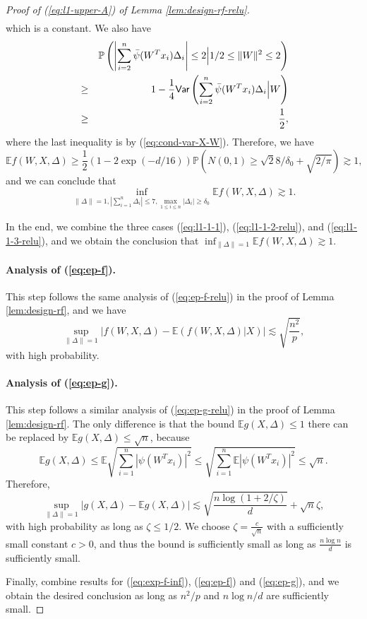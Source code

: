 \begin{proof}[Proof of (\ref{eq:l1-upper-A}) of Lemma \ref{lem:design-rf-relu}]
\begin{eqnarray*}
\end{eqnarray*}
which is a constant. We also have
\begin{eqnarray*}
&& \mathbb{P}\left(\left|\sum_{i=2}^n\bar{\psi}(W^Tx_i)\Delta_i\right|\leq 2\Big|1/2\leq \|W\|^2\leq 2\right) \\
&\geq& 1 - \frac{1}{4}\Var\left(\sum_{i=2}^n\bar{\psi}(W^Tx_i)\Delta_i\Big|W\right) \\
&\geq& \frac{1}{2},
\end{eqnarray*}
where the last inequality is by (\ref{eq:cond-var-X-W}). Therefore, we have
$$\mathbb{E}f(W,X,\Delta)\geq \frac{1}{2}\left(1-2\exp(-d/16)\right)\mathbb{P}\left(N(0,1)\geq \sqrt{2}8/\delta_0 + \sqrt{2/\pi}\right)\gtrsim 1,$$
and we can conclude that
\begin{equation}
\inf_{\|\Delta\|=1,|\sum_{i=1}^n\Delta_i|\leq 7, \max_{1\leq i\leq n}|\Delta_i|\geq\delta_0}\mathbb{E}f(W,X,\Delta) \gtrsim 1.\label{eq:l1-1-3-relu}
\end{equation}

In the end, we combine the three cases (\ref{eq:l1-1-1}), (\ref{eq:l1-1-2-relu}), and (\ref{eq:l1-1-3-relu}),  and we obtain the conclusion that $\inf_{\|\Delta\|=1}\mathbb{E}f(W,X,\Delta)\gtrsim 1$.


\paragraph{Analysis of (\ref{eq:ep-f}).} This step follows the same analysis of (\ref{eq:ep-f-relu}) in the proof of Lemma \ref{lem:design-rf}, and we have
$$\sup_{\|\Delta\|=1}\left|f(W,X,\Delta)-\mathbb{E}(f(W,X,\Delta)|X)\right|\lesssim \sqrt{\frac{n^2}{p}},$$
with high probability.

\paragraph{Analysis of (\ref{eq:ep-g}).} This step follows a similar analysis of (\ref{eq:ep-g-relu}) in the proof of Lemma \ref{lem:design-rf}. The only difference is that the bound $\mathbb{E}g(X,\Delta)\leq 1$ there can be replaced by $\mathbb{E}g(X,\Delta)\leq \sqrt{n}$, because
$$\mathbb{E}g(X,\Delta)\leq \mathbb{E}\sqrt{\sum_{i=1}^n|\psi(W^Tx_i)|^2}\leq \sqrt{\sum_{i=1}^n\mathbb{E}|\psi(W^Tx_i)|^2}\leq \sqrt{n}.$$
Therefore,
$$\sup_{\|\Delta\|=1}|g(X,\Delta) - \mathbb{E}g(X,\Delta)|\lesssim \sqrt{\frac{n\log(1+2/\zeta)}{d}} + \sqrt{n}\zeta,$$
with high probability as long as $\zeta\leq 1/2$. We choose $\zeta=\frac{c}{\sqrt{n}}$ with a sufficiently small constant $c>0$, and thus the bound is sufficiently small as long as $\frac{n\log n}{d}$ is sufficiently small.

Finally, combine results for (\ref{eq:exp-f-inf}), (\ref{eq:ep-f}) and (\ref{eq:ep-g}), and we obtain the desired conclusion as long as $n^2/p$ and $n\log n/d$ are sufficiently small.
\end{proof}

